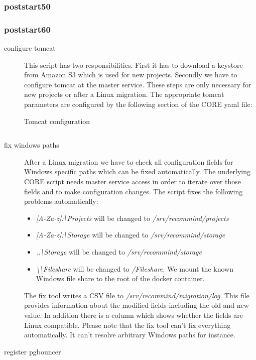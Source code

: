 			\subsubsection{poststart50}
			\subsubsection{poststart60}
			\begin{description}
				\item[configure tomcat] This script has two responsibilities. First it has to download a keystore from Amazon S3 which is used for new projects. Secondly we have to configure tomcat at the master service. These steps are only necessary for new projects or after a Linux migration. The appropriate tomcat parameters are configured by the following section of the CORE yaml file:
				
				\begin{listing}[H]
					\caption{Tomcat configuration}
					\label{lst:p01:ch02:core_tomcat_desc}
					\inputminted{yaml}{\relative{chapter_02/section_3.2/tomcat_example.yaml}}
				\end{listing}
				\item[fix windows paths] After a Linux migration we have to check all configuration fields for Windows specific paths which can be fixed automatically. The underlying CORE script needs master service access in order to iterate over those fields and to make configuration changes. The script fixes the following problems automatically:
				\begin{itemize}
					\item \emph{[A-Za-z]:\textbackslash Projects} will be changed to \emph{/srv/recommind/projects}
					\item \emph{[A-Za-z]:\textbackslash Storage} will be changed to \emph{/srv/recommind/storage}
					\item \emph{..\textbackslash Storage} will be changed to \emph{/srv/recommind/storage}
					\item \emph{\textbackslash \textbackslash Fileshare} will be changed to \emph{/Fileshare}. We mount the known Windows file share to the root of the docker container.
				\end{itemize}
					
					The fix tool writes a CSV file to \emph{/srv/recommind/migration/log}. This file provides information about the modified fields including the old and new value. In addition there is a column which shows whether the fields are Linux compatible. Please note that the fix tool can't fix everything automatically. It can't resolve arbitrary Windows paths for instance.
				\item[register pgbouncer]
			\end{description}

